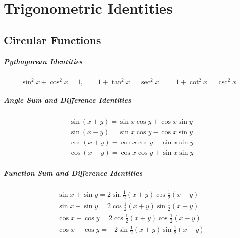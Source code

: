










\raggedbottom
\chapter{Trigonometric Identities}
\label{trigonometric_identities}
\raggedbottom 
\section{Circular Functions}

\paragraph{Pythagorean Identities}
\[      \sin^2 x + \cos^2 x = 1, \qquad
1 + \tan^2 x = \sec^2 x, \qquad
1 + \cot^2 x = \csc^2 x \]

\paragraph{Angle Sum and Difference Identities}
\begin{align*}
  &\sin(x+y) = \sin x \cos y + \cos x \sin y \\
  &\sin(x-y) = \sin x \cos y - \cos x \sin y \\
  &\cos(x+y) = \cos x \cos y - \sin x \sin y \\
  &\cos(x-y) = \cos x \cos y + \sin x \sin y 
\end{align*}

\paragraph{Function Sum and Difference Identities}
\begin{align*}
  &\sin x + \sin y = 2 \sin \frac{1}{2}(x+y) \cos \frac{1}{2}(x-y) \\
  &\sin x - \sin y = 2 \cos \frac{1}{2}(x+y) \sin \frac{1}{2}(x-y) \\
  &\cos x + \cos y = 2 \cos \frac{1}{2}(x+y) \cos \frac{1}{2}(x-y) \\
  &\cos x - \cos y =-2 \sin \frac{1}{2}(x+y) \sin \frac{1}{2}(x-y) 
\end{align*}


